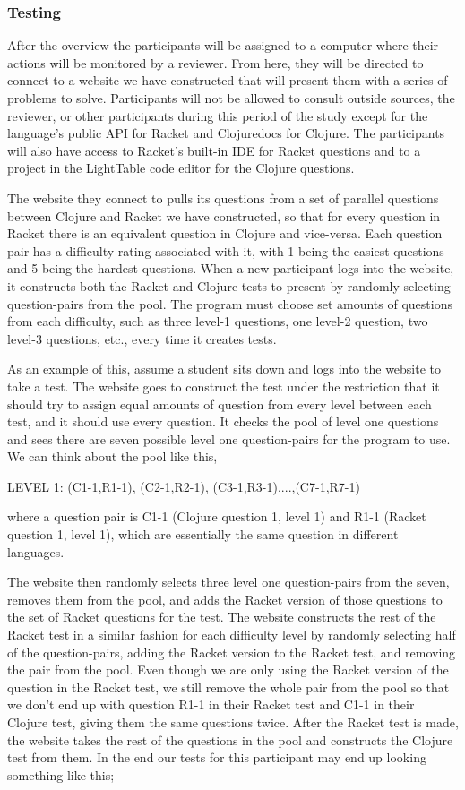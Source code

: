 \documentclass[12pt]{article}
\begin{document}
\subsubsection{Testing}\label{subsec:testing}

After the overview the participants will be assigned to a computer where their actions will be monitored by a reviewer. 
From here, they will be directed to connect to a website we have constructed that will present them with a series of problems to solve. 
Participants will not be allowed to consult outside sources, the reviewer, or other participants during this period of the study except for the language's public API for Racket and Clojuredocs for Clojure.
The participants will also have access to Racket's built-in IDE for Racket questions and to a project in the LightTable code editor for the Clojure questions. 

The website they connect to pulls its questions from a set of parallel questions between Clojure and Racket we have constructed, so that for every question in Racket there is an equivalent question in Clojure and vice-versa.
Each question pair has a difficulty rating associated with it, with 1 being the easiest questions and 5 being the hardest questions.
When a new participant logs into the website, it constructs both the Racket and Clojure tests to present by randomly selecting question-pairs from the pool. 
The program must choose set amounts of questions from each difficulty, such as three level-1 questions, one level-2 question, two level-3 questions, etc., every time it creates tests. 

As an example of this, assume a student sits down and logs into the website to take a test.
The website goes to construct the test under the restriction that it should try to assign equal amounts of question from every level between each test, and it should use every question. 
It checks the pool of level one questions and sees there are seven possible level one question-pairs for the program to use.
We can think about the pool like this,

LEVEL 1: (C1-1,R1-1), (C2-1,R2-1), (C3-1,R3-1),...,(C7-1,R7-1)

where a question pair is C1-1 (Clojure question 1, level 1) and R1-1 (Racket question 1, level 1), which are essentially the same question in different languages.

The website then randomly selects three level one question-pairs from the seven, removes them from the pool, and adds the Racket version of those questions to the set of Racket questions for the test.
The website constructs the rest of the Racket test in a similar fashion for each difficulty level by randomly selecting half of the question-pairs, adding the Racket version to the  Racket test, and removing the pair from the pool.
Even though we are only using the Racket version of the question in the Racket test, we still remove the whole pair from the pool so that we don't end up with question R1-1 in their Racket test and C1-1 in their Clojure test, giving them the same questions twice. 
After the Racket test is made, the website takes the rest of the questions in the pool and constructs the Clojure test from them.
In the end our tests for this participant may end up looking something like this; 
\end{document}
